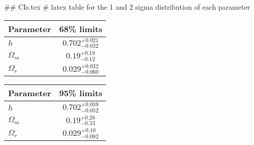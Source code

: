 ## CIs.tex
# latex table for the 1 and 2 sigma distribution of each parameter

\begin{tabular} { l  c}
 Parameter &  68\% limits\\
\hline
{\boldmath$h              $} & $0.702^{+0.021}_{-0.032}   $\\
{\boldmath$\Omega_m       $} & $0.19^{+0.18}_{-0.12}      $\\
{\boldmath$\Omega_r       $} & $0.029^{+0.032}_{-0.060}   $\\
\hline
\end{tabular}

\begin{tabular} { l  c}
 Parameter &  95\% limits\\
\hline
{\boldmath$h              $} & $0.702^{+0.059}_{-0.052}   $\\
{\boldmath$\Omega_m       $} & $0.19^{+0.28}_{-0.33}      $\\
{\boldmath$\Omega_r       $} & $0.029^{+0.10}_{-0.082}    $\\
\hline
\end{tabular}
